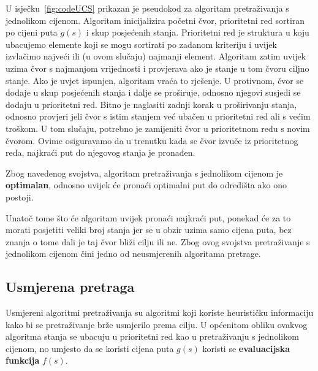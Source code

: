 \documentclass[times, utf8, zavrsni, numeric]{fer}
\begin{document}
\par U isječku~\ref{fig:codeUCS} prikazan je pseudokod za algoritam pretraživanja s jednolikom cijenom. 
Algoritam inicijalizira početni čvor, prioritetni red sortiran po cijeni puta \(g(s)\) i skup posjećenih stanja. 
Prioritetni red je struktura u koju ubacujemo elemente koji se mogu sortirati po zadanom kriteriju i uvijek izvlačimo najveći ili (u ovom slučaju) najmanji element.
Algoritam zatim uvijek uzima čvor s najmanjom vrijednosti i provjerava ako je stanje u tom čvoru ciljno stanje.
Ako je uvjet ispunjen, algoritam vraća to rješenje.
U protivnom, čvor se dodaje u skup posjećenih stanja i dalje se proširuje, odnosno njegovi susjedi se dodaju u prioritetni red.
Bitno je naglasiti zadnji korak u proširivanju stanja, odnosno provjeri jeli čvor s istim stanjem već ubačen u prioritetni red ali s većim troškom.
U tom slučaju, potrebno je zamijeniti čvor u prioritetnom redu s novim čvorom.
Ovime osiguravamo da u trenutku kada se čvor izvuče iz prioritetnog reda, najkraći put do njegovog stanja je pronađen.

\begin{minipage}{\textwidth}
	
\end{minipage}

\par Zbog navedenog svojstva, algoritam pretraživanja s jednolikom cijenom je \textbf{optimalan}, odnosno uvijek će pronaći optimalni put do odredišta ako ono postoji.

\par Unatoč tome što će algoritam uvijek pronaći najkraći put, ponekad će za to morati posjetiti veliki broj stanja jer se u obzir uzima samo cijena puta, bez znanja o tome dali je taj čvor bliži cilju ili ne. 
Zbog ovog svojstva pretraživanje s jednolikom cijenom čini jedno od neusmjerenih algoritama pretrage.

\subsection{Usmjerena pretraga}

\par Usmjereni algoritmi pretraživanja su algoritmi koji koriste heurističku informaciju kako bi se pretraživanje brže usmjerilo prema cilju.
U općenitom obliku ovakvog algoritma stanja se ubacuju u prioritetni red kao u pretraživanju s jednolikom cijenom, no umjesto da se koristi cijena puta \(g(s)\) koristi se \textbf{evaluacijska funkcija} \(f(s)\).
\end{document}
